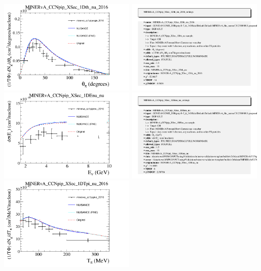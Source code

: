 \documentclass{article}
\begin{document}
\centering
\includegraphics[width=0.49\textwidth]{figures/minerva_cc1pipangle_2016_comp.png}
\includegraphics[width=0.49\textwidth]{figures/minerva_cc1pipangle_2016_info.png}
\centering
\includegraphics[width=0.49\textwidth]{figures/minerva_cc1pipenu_2016_comp.png}
\includegraphics[width=0.49\textwidth]{figures/minerva_cc1pipenu_2016_info.png}
\centering
\includegraphics[width=0.49\textwidth]{figures/minerva_cc1pipke_2016_comp.png}
\end{document}
